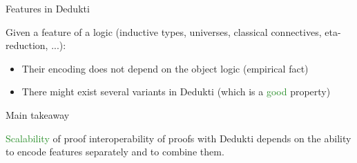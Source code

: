 \documentclass[usenames, dvipsnames]{beamer}
\newcommand{\green}[1]{\textcolor{ForestGreen}{#1}}
\newcommand{\orange}[1]{\textcolor{BurntOrange}{#1}}
\newcommand{\blue}[1]{\textcolor{NavyBlue}{#1}}
\begin{document}
\begin{frame}{Features in Dedukti}

  Given a \blue{feature} of a logic (inductive
  types, universes, classical connectives, eta-reduction, ...):
  \begin{itemize}
  \item Their \orange{encoding} does not depend on the object logic
    (empirical fact)
  \item There might exist several \orange{variants} in Dedukti (which
    is a \green{good} property)
  \end{itemize}
\end{frame}

\begin{frame}{Main takeaway}
    \begin{center}
      \Large{\green{Scalability} of proof interoperability of proofs
        with \blue{Dedukti} depends on the ability to \orange{encode
          features separately} and to \orange{combine} them.}
  \end{center}
\end{frame}
\end{document}
